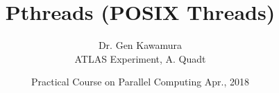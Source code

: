 \documentclass[10pt]{beamer}
\title{Pthreads (POSIX Threads)}
\date{Practical Course on Parallel Computing
Apr., 2018}
\author[Practial Course on Parallel Computing - Pthreads]{Dr. Gen Kawamura\\ \small{ATLAS Experiment, A. Quadt}}
\institute[2. Physik]{II. Physikalisches Institut, Georg-August-Universit\"at G\"ottingen}
\begin{document}
\begin{frame}
  \titlepage
\end{frame}

\begin{frame}
\begin{columns}
        \tableofcontents
        \vspace{-2cm}\hspace{-2cm}
\end{columns}
\end{frame}
\end{document}
